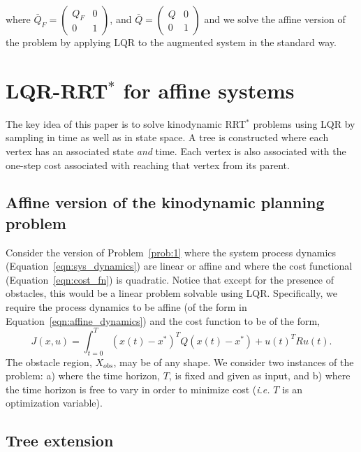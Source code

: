 \documentclass[letterpaper, 10pt, english, conference]{IEEEtran}
\begin{document}
where 
$\bar{Q}_F = \left(
\begin{array}{cc}
Q_F & 0 \\
0 & 1
\end{array}
\right)$, and 
$\bar{Q} = \left(
\begin{array}{cc}
Q & 0 \\
0 & 1
\end{array}
\right)$ and we solve the affine version of the problem by applying
LQR to the augmented system in the standard way.


\section{LQR-RRT$^*$ for affine systems}

The key idea of this paper is to solve kinodynamic RRT$^*$ problems
using LQR by sampling in time as well as in state space. A tree is
constructed where each vertex has an associated state {\em and}
time. Each vertex is also associated with the one-step cost associated
with reaching that vertex from its parent.


\subsection{Affine version of the kinodynamic planning problem}

Consider the version of Problem~\ref{prob:1} where the system process
dynamics (Equation~\ref{eqn:sys_dynamics}) are linear or affine and
where the cost functional (Equation~\ref{eqn:cost_fn}) is
quadratic. Notice that except for the presence of obstacles, this
would be a linear problem solvable using LQR. Specifically, we require
the process dynamics to be affine (of the form in
Equation~\ref{eqn:affine_dynamics}) and the cost function to be of the
form,
\begin{equation}
J(x,u) = \int_{t=0}^{T} (x(t)-x^*)^T Q (x(t)-x^*) + u(t)^T R
u(t).
\label{eqn:affine_lqr_cost_nofinal}
\end{equation}
The obstacle region, $X_{obs}$, may be of any shape. We consider two
instances of the problem: a) where the time horizon, $T$, is fixed and
given as input, and b) where the time horizon is free to vary in order
to minimize cost ({\em i.e.} $T$ is an optimization variable).


\subsection{Tree extension}
\end{document}
